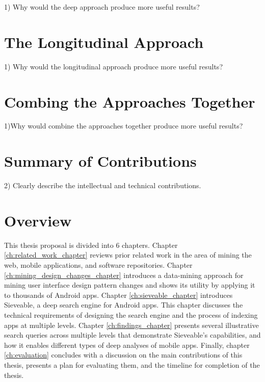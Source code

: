 1) Why would the deep approach produce more useful results?
\pagebreak

\section{The Longitudinal Approach}
1) Why would the longitudinal approach produce more useful results?
\pagebreak

\section{Combing the Approaches Together}
1)Why would combine the approaches together produce more useful results?
\pagebreak

\section{Summary of Contributions}
2) Clearly describe the intellectual and technical contributions.
\pagebreak

\section{Overview}
This thesis proposal is divided into 6 chapters.
Chapter \ref{ch:related_work_chapter} reviews prior related work in the area of mining the web, mobile applications, and software repositories.
Chapter \ref{ch:mining_design_changes_chapter} introduces a data-mining approach for mining user interface design pattern changes and shows its utility by applying it to thousands of Android apps.
Chapter \ref{ch:sieveable_chapter} introduces Sieveable, a deep search engine for Android apps. 
This chapter discusses the technical requirements of designing the search engine and the process of indexing apps at multiple levels.
Chapter \ref{ch:findings_chapter} presents several illustrative search queries across multiple levels that demonstrate Sieveable's capabilities, and how it enables different types of deep analyses of mobile apps.
Finally, chapter \ref{ch:evaluation} concludes with a discussion on the main contributions of this thesis, presents a plan for evaluating them, and the timeline for completion of the thesis.
